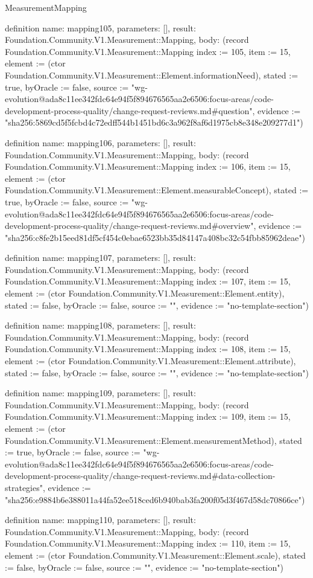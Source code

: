 \begin{lexlean}{MeasurementMapping}
\begin{semanticmodule}
definition{
  name: mapping105,
  parameters: [],
  result: Foundation.Community.V1.Measurement::Mapping,
  body: (record Foundation.Community.V1.Measurement::Mapping {index := 105, item := 15, element := (ctor Foundation.Community.V1.Measurement::Element.informationNeed), stated := true, byOracle := false, source := "wg-evolution@ada8c11ee342fdc64e94f5f894676565aa2e6506:focus-areas/code-development-process-quality/change-request-reviews.md#question", evidence := "sha256:5869cd5f5fcbd4c72edff544b1451bd6c3a962f8af6d1975cb8e348e209277d1"})
}

definition{
  name: mapping106,
  parameters: [],
  result: Foundation.Community.V1.Measurement::Mapping,
  body: (record Foundation.Community.V1.Measurement::Mapping {index := 106, item := 15, element := (ctor Foundation.Community.V1.Measurement::Element.measurableConcept), stated := true, byOracle := false, source := "wg-evolution@ada8c11ee342fdc64e94f5f894676565aa2e6506:focus-areas/code-development-process-quality/change-request-reviews.md#overview", evidence := "sha256:c8fe2b15eed81df5cf454c0ebae6523bb35d84147a408bc32c54fbb85962deae"})
}

definition{
  name: mapping107,
  parameters: [],
  result: Foundation.Community.V1.Measurement::Mapping,
  body: (record Foundation.Community.V1.Measurement::Mapping {index := 107, item := 15, element := (ctor Foundation.Community.V1.Measurement::Element.entity), stated := false, byOracle := false, source := "", evidence := "no-template-section"})
}

definition{
  name: mapping108,
  parameters: [],
  result: Foundation.Community.V1.Measurement::Mapping,
  body: (record Foundation.Community.V1.Measurement::Mapping {index := 108, item := 15, element := (ctor Foundation.Community.V1.Measurement::Element.attribute), stated := false, byOracle := false, source := "", evidence := "no-template-section"})
}

definition{
  name: mapping109,
  parameters: [],
  result: Foundation.Community.V1.Measurement::Mapping,
  body: (record Foundation.Community.V1.Measurement::Mapping {index := 109, item := 15, element := (ctor Foundation.Community.V1.Measurement::Element.measurementMethod), stated := true, byOracle := false, source := "wg-evolution@ada8c11ee342fdc64e94f5f894676565aa2e6506:focus-areas/code-development-process-quality/change-request-reviews.md#data-collection-strategies", evidence := "sha256:e9884b6e388011a44fa52ee518ced6b940bab3fa200f05d3f467d58dc70866ce"})
}

definition{
  name: mapping110,
  parameters: [],
  result: Foundation.Community.V1.Measurement::Mapping,
  body: (record Foundation.Community.V1.Measurement::Mapping {index := 110, item := 15, element := (ctor Foundation.Community.V1.Measurement::Element.scale), stated := false, byOracle := false, source := "", evidence := "no-template-section"})
}


\end{semanticmodule}
\end{lexlean}
